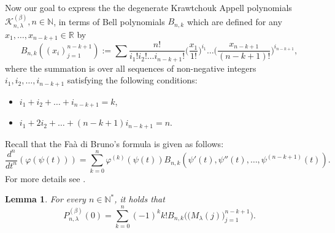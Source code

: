 \documentclass{birkjour}
\newtheorem{lem}[thm]{Lemma}
\theoremstyle{definition}
\theoremstyle{remark}
\numberwithin{equation}{section}
\begin{document}
Now our goal to express the the degenerate Krawtchouk Appell
polynomials $\mathcal{K}^{(\beta)}_{n, \lambda}, n\in \mathbb{N}$,
in terms of Bell polynomials $B_{n,k}$ which are defined for any
$x_{1}, \ldots , x_{n-k+1}\in \mathbb{R}$ by
$$B_{n,k}((x_{i})^{n-k+1}_{j=1}):=
\displaystyle{\sum\frac{n!}{i_{1}!i_{2}!\ldots
i_{n-k+1}!}\Big(\frac{x_{1}}{1!}\Big)^{i_{1}} \ldots
\Big(\frac{x_{n-k+1}}{(n-k+1)!}\Big)^{i_{n-k+1}}},$$ where the
summation is over all sequences of non-negative integers $i_{1},
i_{2}, \ldots , i_{n-k+1}$ satisfying the following conditions:
\begin{itemize}
\item [(i)] $i_{1}+i_{2}+\ldots+i_{n-k+1}=k$,\\
\item [(ii)] $i_{1}+2i_{2}+\ldots+(n-k+1)i_{n-k+1}=n$.
\end{itemize}
Recall that the Fa\`{a} di Bruno's formula is given as follows:
\begin{equation}\label{Bruno-for}
\displaystyle{\frac{d^{n}}{dt^{n}}(\varphi(\psi(t)))=\sum^{n}_{k=0}\varphi^{(k)}(\psi(t))B_{n,
k}(\psi'(t), \psi''(t), \ldots, \psi^{(n-k+1)}(t))}.
\end{equation}
For more details see \cite{[j02]}.
\begin{lem}\label{lemma-tech1}
For every $n \in \mathbb{N}^{\ast}$, it holds that
$$P^{(\beta)}_{n, \lambda}(0)=\displaystyle{\sum^{n}_{k=0}(-1)^{k}k!B_{n, k}\Big(\big(M_{\lambda}(j)\big)^{n-k+1}_{j=1}\Big)}.$$
\end{lem}
\end{document}
